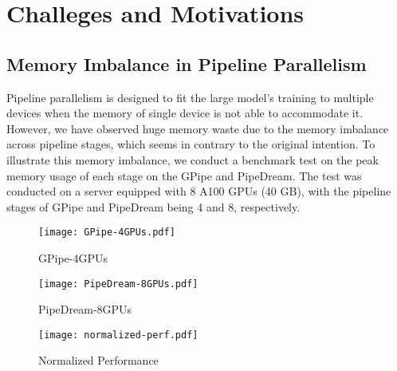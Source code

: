 \section{Challeges and Motivations}
\label{sec:cam}
\subsection{Memory Imbalance in Pipeline Parallelism}
Pipeline parallelism is designed to fit
the large model's training to multiple devices
when the memory of single device is not able to accommodate it.
However, we have observed huge memory waste due to the memory imbalance across pipeline stages,
which seems in contrary to the original intention.
To illustrate this memory imbalance, we conduct a benchmark test on the peak memory usage of
each stage on the GPipe and PipeDream.
The test was conducted on a server equipped with 8 A100 GPUs (40 GB),
with the pipeline stages of GPipe and PipeDream being 4 and 8, respectively.
\begin{figure*}[t]
  \centering
  \begin{minipage}[t]{0.33\linewidth}
    \centering
    \texttt{[image: GPipe-4GPUs.pdf]}
    \caption{GPipe-4GPUs}
    \label{fig:gpipe-4gpus}
  \end{minipage}
  \begin{minipage}[t]{0.33\linewidth}
    \centering
    \texttt{[image: PipeDream-8GPUs.pdf]}
    \caption{PipeDream-8GPUs}
    \label{fig:pd-8gpus}
  \end{minipage}
  \begin{minipage}[t]{0.33\linewidth}
    \centering
    \texttt{[image: normalized-perf.pdf]}
    \caption{Normalized Performance}
    \label{fig:norm-perf}
  \end{minipage}
\end{figure*}


